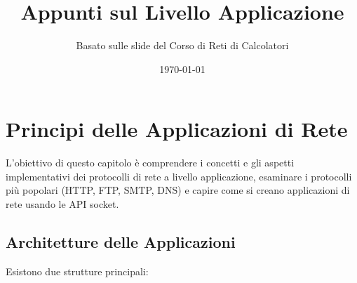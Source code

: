 \documentclass{article}
\title{\textbf{Appunti sul Livello Applicazione}}
\author{Basato sulle slide del Corso di Reti di Calcolatori}
\date{\today}
\begin{document}
\maketitle
\tableofcontents
\newpage

\section{Principi delle Applicazioni di Rete}
L'obiettivo di questo capitolo è comprendere i concetti e gli aspetti implementativi dei protocolli di rete a livello applicazione, esaminare i protocolli più popolari (HTTP, FTP, SMTP, DNS) e capire come si creano applicazioni di rete usando le API socket.

\subsection{Architetture delle Applicazioni}
Esistono due strutture principali:
\end{document}
